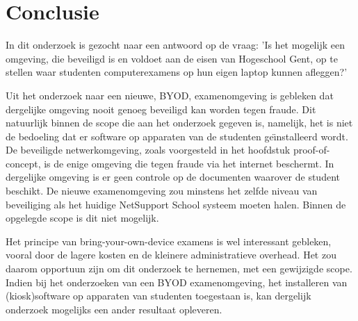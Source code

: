 
\chapter{Conclusie}
\label{ch:conclusie}



In dit onderzoek is gezocht naar een antwoord op de vraag: 'Is het mogelijk een omgeving, die beveiligd is en voldoet aan de eisen van Hogeschool Gent, op te stellen waar studenten computerexamens op hun eigen laptop kunnen afleggen?'

Uit het onderzoek naar een nieuwe, BYOD, examenomgeving is gebleken dat dergelijke omgeving nooit genoeg beveiligd kan worden tegen fraude. Dit natuurlijk binnen de scope die aan het onderzoek gegeven is, namelijk, het is niet de bedoeling dat er software op apparaten van de studenten ge\"{\i}nstalleerd wordt. De beveiligde netwerkomgeving, zoals voorgesteld in het hoofdstuk proof-of-concept, is de enige omgeving die tegen fraude via het internet beschermt. In dergelijke omgeving is er geen controle op de documenten waarover de student beschikt. De nieuwe examenomgeving zou minstens het zelfde niveau van beveiliging als het huidige NetSupport School systeem moeten halen. Binnen de opgelegde scope is dit niet mogelijk. 

Het principe van bring-your-own-device examens is wel interessant gebleken, vooral door de lagere kosten en de kleinere administratieve overhead. Het zou daarom opportuun zijn om dit onderzoek te hernemen, met een gewijzigde scope. Indien bij het onderzoeken van een BYOD examenomgeving, het installeren van (kiosk)software op apparaten van studenten toegestaan is, kan dergelijk onderzoek mogelijks een ander resultaat opleveren.




